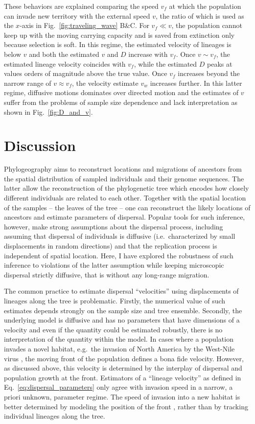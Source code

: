\documentclass[aps,rmp, twocolumn]{revtex4}
\newcommand{\vfkpp}{v_f}
\begin{document}
These behaviors are explained comparing the speed $\vfkpp$ at which the population can invade new territory with the external speed $v$, the ratio of which is used as the $x$-axis in Fig.~\ref{fig:traveling_wave} B\&C.
For $\vfkpp \ll v$, the population cannot keep up with the moving carrying capacity and is saved from extinction only because selection is soft.
In this regime, the estimated velocity of lineages is below $v$ and both the estimated $v$ and $D$ increase with $\vfkpp$.
Once $v\sim \vfkpp$, the estimated lineage velocity coincides with $\vfkpp$, while the estimated $D$ peaks at values orders of magnitude above the true value.
Once $\vfkpp$ increases beyond the narrow range of $v\approx\vfkpp$, the velocity estimate $v_w$ increases further.
In this latter regime, diffusive motions dominates over directed motion and the estimates of $v$ suffer from the problems of sample size dependence and lack interpretation as shown in Fig.~\ref{fig:D_and_v}.


\section*{Discussion}
Phylogeography aims to reconstruct locations and migrations of ancestors from the spatial distribution of sampled individuals and their genome sequences.
The latter allow the reconstruction of the phylogenetic tree which encodes how closely different individuals are related to each other.
Together with the spatial location of the samples -- the leaves of the tree -- one can reconstruct the likely locations of ancestors and estimate parameters of dispersal.
Popular tools for such inference, however, make strong assumptions about the dispersal process, including assuming that dispersal of individuals is diffusive (i.e.~characterized by small displacements in random directions) and that the replication process is independent of spatial location.
Here, I have explored the robustness of such inference to violations of the latter assumption while keeping microscopic dispersal strictly diffusive, that is without any long-range migration.

The common practice to estimate dispersal ``velocities'' using displacements of lineages along the tree \citep{dellicour_relax_2021} is problematic.
Firstly, the numerical value of such estimates depends strongly on the sample size and tree ensemble.
Secondly, the underlying model is diffusive and has no parameters that have dimensions of a velocity and even if the quantity could be estimated robustly, there is no interpretation of the quantity within the model.
In cases where a population invades a novel habitat, e.g.~the invasion of North America by the West-Nile virus \citep{pybus_unifying_2012}, the moving front of the population defines a bona fide velocity.
However, as discussed above, this velocity is determined by the interplay of dispersal and population growth at the front.
Estimators of a ``lineage velocity'' as defined in Eq.~\ref{eq:dispersal_parameters} only agree with invasion speed in a narrow, a priori unknown, parameter regime.
The speed of invasion into a new habitat is better determined by modeling the position of the front \citep{pybus_unifying_2012}, rather than by tracking individual lineages along the tree.
\end{document}
